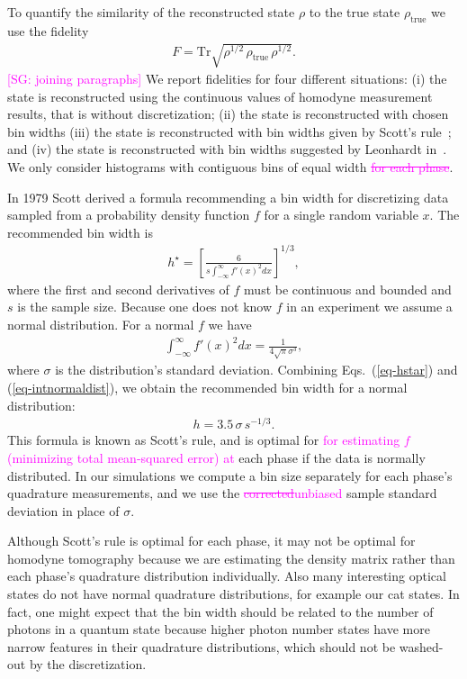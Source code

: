 \documentclass[
reprint,
superscriptaddress,
showpacs,
amsmath,
amssymb,
aps,
pra,
longbibliography
]{revtex4-1}
\providecommand{\aucmnt}[1]{#1}
\providecommand{\editcolor}[2]{\textcolor{#1}{#2}}
\providecommand{\aucmnt}[1]{}
\providecommand{\editcolor}[2]{#2}
\newcommand{\SG}[1]{\editcolor{magenta}{#1}}
\newcommand{\SGs}[1]{\aucmnt{\editcolor{magenta}{\sout{#1}}}}
\newcommand{\SGc}[1]{\aucmnt{\editcolor{magenta}{[SG: #1]}}}
\newcommand{\rhotrue}{\rho_{\text{true}}}
\begin{document}
To quantify the similarity of the reconstructed state $\rho$ to the
true state $\rhotrue$ we use the fidelity
\begin{eqnarray}
  F = \mathrm{Tr} \sqrt{\rho^{1/2}\, \rhotrue \, \rho^{1/2}}.
\end{eqnarray}
\SGc{joining paragraphs} We report fidelities for four different
situations: (i) the state is reconstructed using the continuous values
of homodyne measurement results, that is without discretization; (ii)
the state is reconstructed with chosen bin widths (iii) the state is
reconstructed with bin widths given by Scott's rule~\cite{Scott2010};
and (iv) the state is reconstructed with bin widths suggested by
Leonhardt in~\cite{Leonhardt1997}. We only consider histograms with
contiguous bins of equal width\SGs{ for each phase}.

In 1979 Scott derived a formula recommending a bin width for
discretizing data sampled from a probability density function $f$ for
a single random variable $x$. The recommended bin width is
\begin{eqnarray}
  h^{\star} = \left[ \frac{6}{s \int_{-\infty}^{\infty} f'(x)^2 dx} \right]^{1/3},
  \label{eq-hstar}
\end{eqnarray}
where the first and second derivatives of $f$ must be continuous and
bounded and $s$ is the sample size. Because one does not know $f$ in
an experiment we assume a normal distribution. For a normal $f$ we
have
\begin{eqnarray}
  \int_{-\infty}^{\infty} f'(x)^2 dx = \frac{1}{4 \sqrt{\pi} \sigma ^3},
  \label{eq-intnormaldist}
\end{eqnarray}
where $\sigma$ is the distribution's standard deviation.  Combining
Eqs.~(\ref{eq-hstar}) and (\ref{eq-intnormaldist}), we obtain the
recommended bin width for a normal distribution:
\begin{eqnarray}
  h = 3.5 \, \sigma \, s^{-1/3}.
\end{eqnarray}
This formula is known as Scott's rule, and is optimal for \SG{for
  estimating $f$ (minimizing total mean-squared error) at} each phase
if the data is normally distributed. In our simulations we compute a
bin size separately for each phase's quadrature measurements, and we
use the \SGs{corrected}\SG{unbiased} sample standard deviation in
place of $\sigma$.

Although Scott's rule is optimal for each phase, it may not be optimal
for homodyne tomography because we are estimating the density matrix
rather than each phase's quadrature distribution individually.  Also
many interesting optical states do not have normal quadrature
distributions, for example our cat states.  In fact, one might expect
that the bin width should be related to the number of photons in a
quantum state because higher photon number states have more narrow
features in their quadrature distributions, which should not be
washed-out by the discretization.
\end{document}
